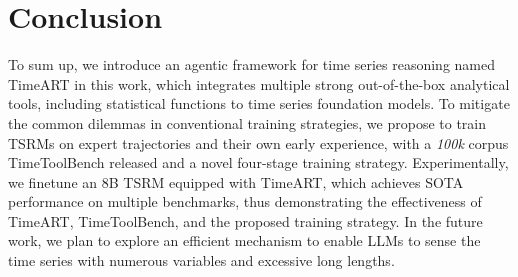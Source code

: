 \section{Conclusion}
To sum up, we introduce an agentic framework for time series reasoning named TimeART in this work, which integrates multiple strong out-of-the-box analytical tools, including statistical functions to time series foundation models. To mitigate the common dilemmas in conventional training strategies, we propose to train TSRMs on expert trajectories and their own early experience, with a \textit{100k} corpus TimeToolBench released and a novel four-stage training strategy. Experimentally, we finetune an 8B TSRM equipped with TimeART, which achieves SOTA performance on multiple benchmarks, thus demonstrating the effectiveness of TimeART, TimeToolBench, and the proposed training strategy. In the future work, we plan to explore an efficient mechanism to enable LLMs to sense the time series with numerous variables and excessive long lengths. 